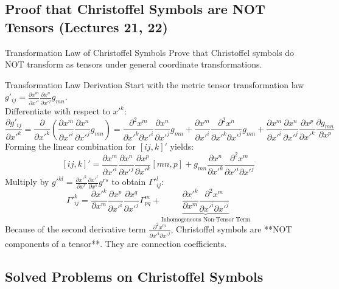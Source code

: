 \documentclass[11pt,a4paper]{article}
\begin{document}
\subsection{Proof that Christoffel Symbols are NOT Tensors (Lectures 21, 22)}
\begin{theorembox}{Transformation Law of Christoffel Symbols}
Prove that Christoffel symbols do NOT transform as tensors under general coordinate transformations.
\end{theorembox}
\begin{proofbox}{Transformation Law Derivation}
Start with the metric tensor transformation law $g'_{ij} = \frac{\partial x^m}{\partial x'^i} \frac{\partial x^n}{\partial x'^j} g_{mn}$. \\
Differentiate with respect to $x'^k$:
\[
\frac{\partial g'_{ij}}{\partial x'^k} = \frac{\partial}{\partial x'^k} \left( \frac{\partial x^m}{\partial x'^i} \frac{\partial x^n}{\partial x'^j} g_{mn} \right) = \frac{\partial^2 x^m}{\partial x'^k \partial x'^i} \frac{\partial x^n}{\partial x'^j} g_{mn} + \frac{\partial x^m}{\partial x'^i} \frac{\partial^2 x^n}{\partial x'^k \partial x'^j} g_{mn} + \frac{\partial x^m}{\partial x'^i} \frac{\partial x^n}{\partial x'^j} \frac{\partial x^p}{\partial x'^k} \frac{\partial g_{mn}}{\partial x^p}
\]
Forming the linear combination for $[ij, k]'$ yields:
\[
[ij, k]' = \frac{\partial x^m}{\partial x'^i} \frac{\partial x^n}{\partial x'^j} \frac{\partial x^p}{\partial x'^k} [mn, p] + g_{mn} \frac{\partial x^n}{\partial x'^k} \frac{\partial^2 x^m}{\partial x'^i \partial x'^j}
\]
Multiply by $g'^{kl} = \frac{\partial x'^k}{\partial x^r} \frac{\partial x'^l}{\partial x^s} g^{rs}$ to obtain $\Gamma'^l_{ij}$:
\[
\Gamma'^k_{ij} = \frac{\partial x'^k}{\partial x^m} \frac{\partial x^p}{\partial x'^i} \frac{\partial x^q}{\partial x'^j} \Gamma^m_{pq} + \underbrace{\frac{\partial x'^k}{\partial x^m} \frac{\partial^2 x^m}{\partial x'^i \partial x'^j}}_{\text{Inhomogeneous Non-Tensor Term}}
\]
Because of the second derivative term $\frac{\partial^2 x^m}{\partial x'^i \partial x'^j}$, Christoffel symbols are **NOT components of a tensor**. They are connection coefficients.
\end{proofbox}

\subsection{Solved Problems on Christoffel Symbols}
\end{document}
